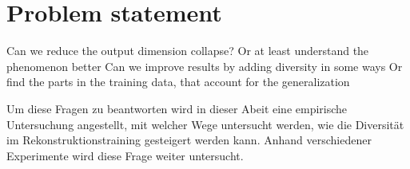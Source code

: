 
\section{Problem statement}
Can we reduce the output dimension collapse?
    Or at least understand the phenomenon better
Can we improve results by adding diversity in some ways
    Or find the parts in the training data, that account for the generalization

Um diese Fragen zu beantworten wird in dieser Abeit eine empirische Untersuchung angestellt, mit welcher Wege untersucht werden, wie die Diversität im Rekonstruktionstraining gesteigert werden kann. Anhand verschiedener Experimente wird diese Frage weiter untersucht. 